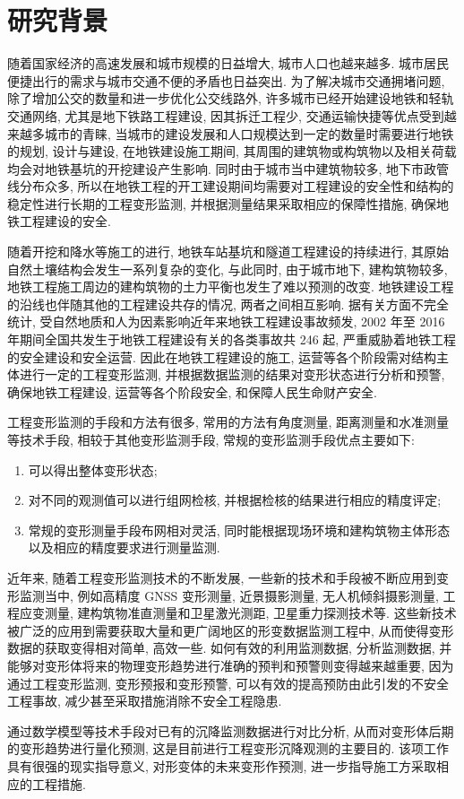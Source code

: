 \section{研究背景}
随着国家经济的高速发展和城市规模的日益增大, 城市人口也越来越多. 城市居民便捷出行的需求与城市交通不便的矛盾也日益突出. 为了解决城市交通拥堵问题, 除了增加公交的数量和进一步优化公交线路外, 许多城市已经开始建设地铁和轻轨交通网络, 尤其是地下铁路工程建设, 因其拆迁工程少, 交通运输快捷等优点受到越来越多城市的青睐, 当城市的建设发展和人口规模达到一定的数量时需要进行地铁的规划, 设计与建设, 在地铁建设施工期间, 其周围的建筑物或构筑物以及相关荷载均会对地铁基坑的开挖建设产生影响. 同时由于城市当中建筑物较多, 地下市政管线分布众多, 所以在地铁工程的开工建设期间均需要对工程建设的安全性和结构的稳定性进行长期的工程变形监测, 并根据测量结果采取相应的保障性措施, 确保地铁工程建设的安全. 

随着开挖和降水等施工的进行, 地铁车站基坑和隧道工程建设的持续进行, 其原始自然土壤结构会发生一系列复杂的变化, 与此同时, 由于城市地下, 建构筑物较多, 地铁工程施工周边的建构筑物的土力平衡也发生了难以预测的改变. 地铁建设工程的沿线也伴随其他的工程建设共存的情况, 两者之间相互影响. 据有关方面不完全统计, 受自然地质和人为因素影响近年来地铁工程建设事故频发, 2002 年至 2016 年期间全国共发生于地铁工程建设有关的各类事故共 246 起, 严重威胁着地铁工程的安全建设和安全运营. 因此在地铁工程建设的施工, 运营等各个阶段需对结构主体进行一定的工程变形监测, 并根据数据监测的结果对变形状态进行分析和预警, 确保地铁工程建设, 运营等各个阶段安全, 和保障人民生命财产安全. 

工程变形监测的手段和方法有很多, 常用的方法有角度测量, 距离测量和水准测量等技术手段, 相较于其他变形监测手段, 常规的变形监测手段优点主要如下: 

\begin{enumerate}
    \item 可以得出整体变形状态;
    \item 对不同的观测值可以进行组网检核, 并根据检核的结果进行相应的精度评定;
    \item 常规的变形测量手段布网相对灵活, 同时能根据现场环境和建构筑物主体形态以及相应的精度要求进行测量监测. 
\end{enumerate}

近年来, 随着工程变形监测技术的不断发展, 一些新的技术和手段被不断应用到变形监测当中, 例如高精度 GNSS 变形测量, 近景摄影测量, 无人机倾斜摄影测量, 工程应变测量, 建构筑物准直测量和卫星激光测距, 卫星重力探测技术等. 这些新技术被广泛的应用到需要获取大量和更广阔地区的形变数据监测工程中, 从而使得变形数据的获取变得相对简单, 高效一些. 如何有效的利用监测数据, 分析监测数据, 并能够对变形体将来的物理变形趋势进行准确的预判和预警则变得越来越重要, 因为通过工程变形监测, 变形预报和变形预警, 可以有效的提高预防由此引发的不安全工程事故, 减少甚至采取措施消除不安全工程隐患. 

通过数学模型等技术手段对已有的沉降监测数据进行对比分析, 从而对变形体后期的变形趋势进行量化预测, 这是目前进行工程变形沉降观测的主要目的. 该项工作具有很强的现实指导意义, 对形变体的未来变形作预测, 进一步指导施工方采取相应的工程措施. 